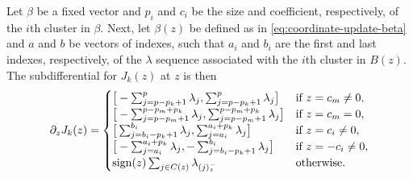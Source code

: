 \begin{theorem}\label{thm:cluster-subdifferential}
  Let \(\beta\) be a fixed vector and \(p_i\) and \(c_i\) be the size and
  coefficient, respectively, of the \(i\)th cluster in \(\beta\).
  Next, let \(\beta(z)\) be defined as in \eqref{eq:coordinate-update-beta}
  and \(a\) and \(b\) be vectors of indexes, such that
  \(a_i\) and \(b_i\) are the first and last indexes, respectively,
  of the \(\lambda\) sequence associated with the \(i\)th cluster
  in \(B(z)\). The subdifferential for \(J_k(z)\) at \(z\) is
  then
  \[
    \partial_{z} J_k(z) =
    \begin{cases}
      \big[-\sum_{j = p - p_k + 1}^{p}\lambda_j, \sum_{j = p - p_k + 1}^{p}\lambda_j\big]                                                                         & \text{if } z = c_m \neq 0,  \\
      \big[-\sum_{j = p - p_m + 1}^{p - p_m + p_k}\lambda_j, \sum_{j = p - p_m + 1}^{p - p_m + p_k}\lambda_j\big] & \text{if } z = c_m = 0,     \\
      \big[\sum_{j = b_i - p_k + 1}^{b_i}\lambda_j, \sum_{j = a_i}^{a_i + p_k} \lambda_j\big]                                                                 & \text{if } z = c_i \neq 0,  \\
      \big[-\sum_{j = a_i}^{a_i + p_k} \lambda_j, -\sum_{j = b_i - p_k + 1}^{b_i}\lambda_j\big]                                                               & \text{if } z = -c_i \neq 0, \\
      \operatorname{sign}(z)\sum_{j \in C(z)} \lambda_{(j)^-_z}                                                                                                                 & \text{otherwise.}           \\
    \end{cases}
  \]
\end{theorem}
